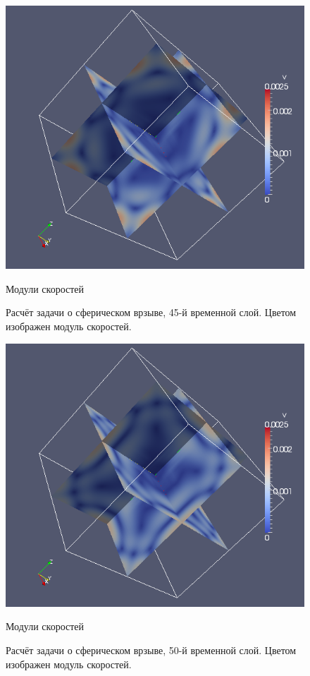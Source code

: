 \begin{figure}[htp]
\centering
\includegraphics[width=\textwidth]{png/spherical-explosion-test/v-scalar/0045.png}
\caption{Модули скоростей}
\caption{Расчёт задачи о сферическом врзыве, 45-й временной слой. Цветом изображен модуль скоростей.}
\end{figure}

\begin{figure}[htp]
\centering
\includegraphics[width=\textwidth]{png/spherical-explosion-test/v-scalar/0050.png}
\caption{Модули скоростей}
\caption{Расчёт задачи о сферическом врзыве, 50-й временной слой. Цветом изображен модуль скоростей.}
\end{figure}

